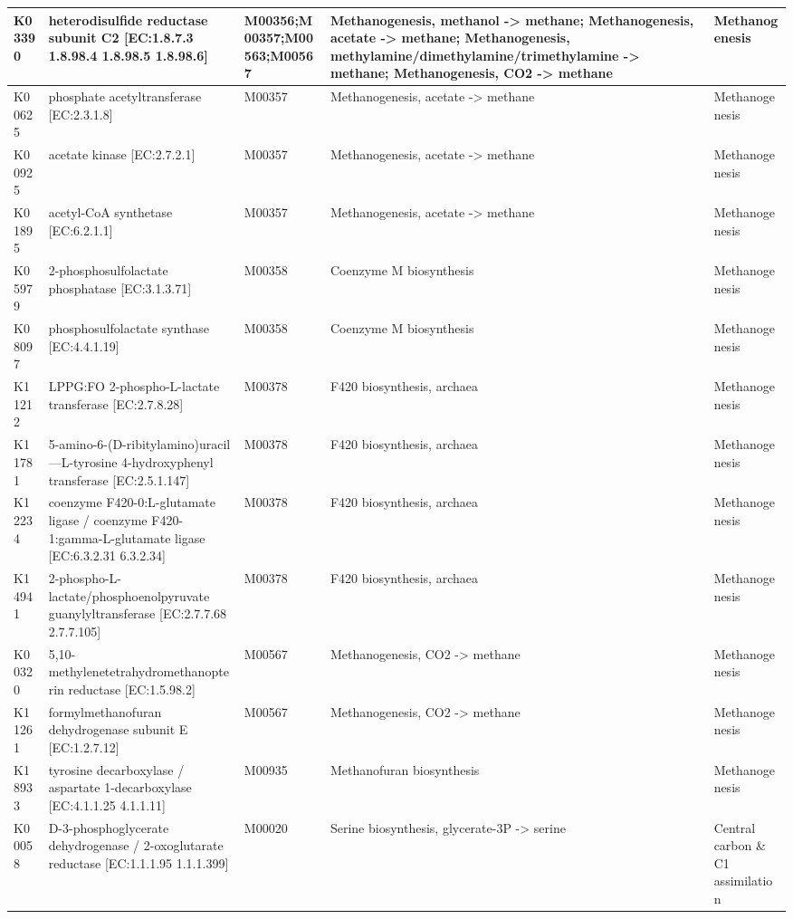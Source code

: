 {\begin{longtable}{|l|p{4.5cm}|p{2.3cm}|p{3.7cm}|p{2.5cm}|}
K03390 & heterodisulfide reductase subunit C2 [EC:1.8.7.3 1.8.98.4 1.8.98.5 1.8.98.6] & M00356;M00357;M00563;M00567 & Methanogenesis, methanol -> methane; Methanogenesis, acetate -> methane; Methanogenesis, methylamine/dimethylamine/trimethylamine -> methane; Methanogenesis, CO2 -> methane & Methanogenesis \\ \hline
K00625 & phosphate acetyltransferase [EC:2.3.1.8] & M00357 & Methanogenesis, acetate -> methane & Methanogenesis \\ \hline
K00925 & acetate kinase [EC:2.7.2.1] & M00357 & Methanogenesis, acetate -> methane & Methanogenesis \\ \hline
K01895 & acetyl-CoA synthetase [EC:6.2.1.1] & M00357 & Methanogenesis, acetate -> methane & Methanogenesis \\ \hline
K05979 & 2-phosphosulfolactate phosphatase [EC:3.1.3.71] & M00358 & Coenzyme M biosynthesis & Methanogenesis \\ \hline
K08097 & phosphosulfolactate synthase [EC:4.4.1.19] & M00358 & Coenzyme M biosynthesis & Methanogenesis \\ \hline
K11212 & LPPG:FO 2-phospho-L-lactate transferase [EC:2.7.8.28] & M00378 & F420 biosynthesis, archaea & Methanogenesis \\ \hline
K11781 & 5-amino-6-(D-ribitylamino)uracil---L-tyrosine 4-hydroxyphenyl transferase [EC:2.5.1.147] & M00378 & F420 biosynthesis, archaea & Methanogenesis \\ \hline
K12234 & coenzyme F420-0:L-glutamate ligase / coenzyme F420-1:gamma-L-glutamate ligase [EC:6.3.2.31 6.3.2.34] & M00378 & F420 biosynthesis, archaea & Methanogenesis \\ \hline
K14941 & 2-phospho-L-lactate/phosphoenolpyruvate guanylyltransferase [EC:2.7.7.68 2.7.7.105] & M00378 & F420 biosynthesis, archaea & Methanogenesis \\ \hline
K00320 & 5,10-methylenetetrahydromethanopterin reductase [EC:1.5.98.2] & M00567 & Methanogenesis, CO2 -> methane & Methanogenesis \\ \hline
K11261 & formylmethanofuran dehydrogenase subunit E [EC:1.2.7.12] & M00567 & Methanogenesis, CO2 -> methane & Methanogenesis \\ \hline
K18933 & tyrosine decarboxylase / aspartate 1-decarboxylase [EC:4.1.1.25 4.1.1.11] & M00935 & Methanofuran biosynthesis & Methanogenesis \\ \hline
K00058 & D-3-phosphoglycerate dehydrogenase / 2-oxoglutarate reductase [EC:1.1.1.95 1.1.1.399] & M00020 & Serine biosynthesis, glycerate-3P -> serine & Central carbon \& C1 assimilation \\ \hline

\end{longtable}}
